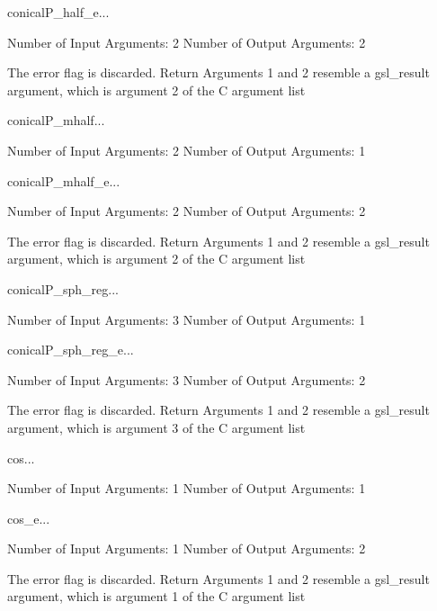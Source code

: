 \begin{funcdesc}{conicalP_half_e}{...}

    Number of Input  Arguments:  2
    Number of Output Arguments:  2

The error flag is discarded.
Return Arguments 1 and 2 resemble a gsl_result argument,
	which is  argument 2 of the C argument list

\end{funcdesc}

\begin{funcdesc}{conicalP_mhalf}{...}

    Number of Input  Arguments:  2
    Number of Output Arguments:  1
\end{funcdesc}

\begin{funcdesc}{conicalP_mhalf_e}{...}

    Number of Input  Arguments:  2
    Number of Output Arguments:  2

The error flag is discarded.
Return Arguments 1 and 2 resemble a gsl_result argument,
	which is  argument 2 of the C argument list

\end{funcdesc}

\begin{funcdesc}{conicalP_sph_reg}{...}

    Number of Input  Arguments:  3
    Number of Output Arguments:  1
\end{funcdesc}

\begin{funcdesc}{conicalP_sph_reg_e}{...}

    Number of Input  Arguments:  3
    Number of Output Arguments:  2

The error flag is discarded.
Return Arguments 1 and 2 resemble a gsl_result argument,
	which is  argument 3 of the C argument list

\end{funcdesc}

\begin{funcdesc}{cos}{...}

    Number of Input  Arguments:  1
    Number of Output Arguments:  1
\end{funcdesc}

\begin{funcdesc}{cos_e}{...}

    Number of Input  Arguments:  1
    Number of Output Arguments:  2

The error flag is discarded.
Return Arguments 1 and 2 resemble a gsl_result argument,
	which is  argument 1 of the C argument list

\end{funcdesc}

